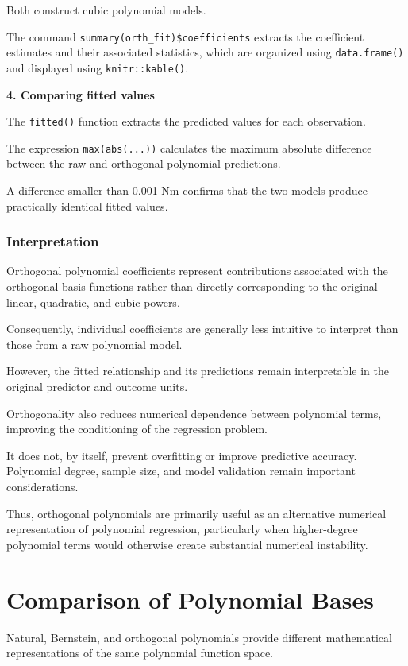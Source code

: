 \documentclass[
  letterpaper,
  DIV=11,
  numbers=noendperiod]{scrreprt}
\begin{document}
Both construct cubic polynomial models.

The command \texttt{summary(orth\_fit)\$coefficients} extracts the
coefficient estimates and their associated statistics, which are
organized using \texttt{data.frame()} and displayed using
\texttt{knitr::kable()}.

\textbf{4. Comparing fitted values}

The \texttt{fitted()} function extracts the predicted values for each
observation.

The expression \texttt{max(abs(...))} calculates the maximum absolute
difference between the raw and orthogonal polynomial predictions.

A difference smaller than 0.001 Nm confirms that the two models produce
practically identical fitted values.

\subsubsection{Interpretation}\label{interpretation}

Orthogonal polynomial coefficients represent contributions associated
with the orthogonal basis functions rather than directly corresponding
to the original linear, quadratic, and cubic powers.

Consequently, individual coefficients are generally less intuitive to
interpret than those from a raw polynomial model.

However, the fitted relationship and its predictions remain
interpretable in the original predictor and outcome units.

Orthogonality also reduces numerical dependence between polynomial
terms, improving the conditioning of the regression problem.

It does not, by itself, prevent overfitting or improve predictive
accuracy. Polynomial degree, sample size, and model validation remain
important considerations.

Thus, orthogonal polynomials are primarily useful as an alternative
numerical representation of polynomial regression, particularly when
higher-degree polynomial terms would otherwise create substantial
numerical instability.

\section{Comparison of Polynomial
Bases}\label{comparison-of-polynomial-bases}

Natural, Bernstein, and orthogonal polynomials provide different
mathematical representations of the same polynomial function space.
\end{document}

